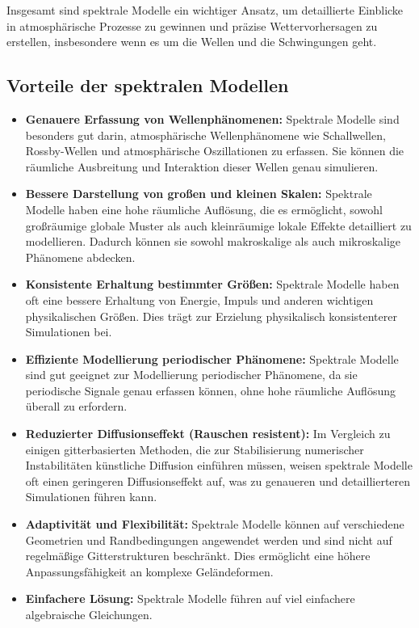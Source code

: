 Insgesamt sind spektrale Modelle ein wichtiger Ansatz, um detaillierte Einblicke in atmosphärische Prozesse zu gewinnen und präzise Wettervorhersagen zu erstellen, insbesondere wenn es um die Wellen und die Schwingungen geht.

\subsection{Vorteile der spektralen Modellen
\label{spektral:subsection:vorteile}}

\begin{itemize}
\item
\textbf{Genauere Erfassung von Wellenphänomenen:} Spektrale Modelle sind besonders gut darin, atmosphärische Wellenphänomene wie Schallwellen, Rossby-Wellen und atmosphärische Oszillationen zu erfassen.
Sie können die räumliche Ausbreitung und Interaktion dieser Wellen genau simulieren.
\item
\textbf{Bessere Darstellung von großen und kleinen Skalen:} Spektrale Modelle haben eine hohe räumliche Auflösung, die es ermöglicht, sowohl großräumige globale Muster als auch kleinräumige lokale Effekte detailliert zu modellieren.
Dadurch können sie sowohl makroskalige als auch mikroskalige Phänomene abdecken.
\item
\textbf{Konsistente Erhaltung bestimmter Größen:} Spektrale Modelle haben oft eine bessere Erhaltung von Energie, Impuls und anderen wichtigen physikalischen Größen.
Dies trägt zur Erzielung physikalisch konsistenterer Simulationen bei.
\item
\textbf{Effiziente Modellierung periodischer Phänomene:} Spektrale Modelle sind gut geeignet zur Modellierung periodischer Phänomene, da sie periodische Signale genau erfassen können, ohne hohe räumliche Auflösung überall zu erfordern.
\item
\textbf{Reduzierter Diffusionseffekt (Rauschen resistent):} Im Vergleich zu einigen gitterbasierten Methoden, die zur Stabilisierung numerischer Instabilitäten künstliche Diffusion einführen müssen, weisen spektrale Modelle oft einen geringeren Diffusionseffekt auf, was zu genaueren und detaillierteren Simulationen führen kann.
\item
\textbf{Adaptivität und Flexibilität:} Spektrale Modelle können auf verschiedene Geometrien und Randbedingungen angewendet werden und sind nicht auf regelmäßige Gitterstrukturen beschränkt.
Dies ermöglicht eine höhere Anpassungsfähigkeit an komplexe Geländeformen.
\item
\textbf{Einfachere Lösung:} Spektrale Modelle führen auf viel einfachere algebraische Gleichungen.
\end{itemize}


